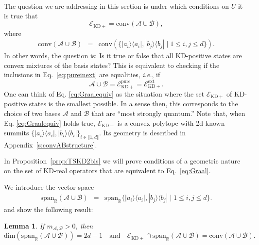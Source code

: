 \documentclass[a4paper, notitlepage, 11pt]{article}
\numberwithin{equation}{section}
\newcommand{\bra}[1]{\langle #1|}
\newcommand{\cket}[1]{|#1\rangle}
\newcommand{\Acal}{{\mathcal A}}
\newcommand{\Bcal}{{\mathcal B}}
\newcommand{\EcalKDC}{{\mathcal E}_{\mathrm{KD+}}}
\newcommand{\EcalKDCpu}{{\mathcal E}_{\mathrm{KD+}}^{\mathrm{pure}}}
\newcommand{\EcalKDCext}{{\mathcal E}_{\mathrm{KD+}}^{\mathrm{ext}}}
\newcommand{\spanRAB}{{\mathrm{span}_{\R}(\Acal\cup\Bcal)}}
\newcommand{\R}{\mathbb{R}}
\newcommand{\mab}{m_{\Acal,\Bcal}}
\newcommand{\conv}[1]{\mathrm{conv}\left(#1\right)}
\newcommand{\IntEnt}[2]{\llbracket #1 , #2 \rrbracket}
\newcommand{\convAB}{\conv{\Acal \cup \Bcal}}
\newtheorem{Lemma}[Theorem]{Lemma}
\begin{document}
 The question we are addressing in this section 
 is under which conditions on $U$ it is true that
\begin{equation}\label{eq:Graal}
\EcalKDC=\convAB,
\end{equation}
where 
\begin{eqnarray}
\convAB&=&\conv{\{\cket{a_i}\bra{a_i}, \cket{b_j}\bra{b_j} \mid 1\leq i,j\leq d\}}.
\end{eqnarray}
 In other words, the question is:  Is it  true or false that all KD-positive states are convex mixtures of the basis states? 
 This is equivalent to {checking if} the inclusions in Eq.~\eqref{eq:pureinext} are equalities, { \textit{i.e.}, if}
\begin{equation}\label{eq:Graalequiv}
\Acal\cup\Bcal=\EcalKDCpu=\EcalKDCext.
\end{equation}
One can think of Eq. \eqref{eq:Graalequiv} as the situation where the set $\EcalKDC$ of KD-positive states is the smallest possible.   In a sense then, this corresponds to the choice of two bases $\Acal$ and $\Bcal$ that are ``most strongly quantum.'' Note that, when Eq. \eqref{eq:Graalequiv} holds true,
$\EcalKDC$ is a convex polytope with 2d known summits $\{\cket{a_i}\bra{a_i}, \cket{b_i}\bra{b_i}\}_{i\in\IntEnt{1}{d}}$. Its geometry is described in  Appendix~\ref{s:convABstructure}.  

In Proposition~\ref{prop:TSKD2bis} we will prove conditions of a geometric nature on the set of KD-real operators that are equivalent to Eq.~\eqref{eq:Graal}. 

 We introduce the vector space
\begin{eqnarray}
\spanRAB&=&\mathrm{span}_{\R} \{\cket{a_i}\bra{a_i}, \cket{b_j}\bra{b_j} \mid 1\leq i,j\leq d\}.
\end{eqnarray}
and show the following result:
\begin{Lemma}\label{lem:G1}
If $\mab> 0$, then
\[
\mathrm{dim}\left(\spanRAB\right) =2d- 1\quad\mathrm{and}\quad \EcalKDC\cap \spanRAB =\convAB.
\]
\end{Lemma}
\end{document}
